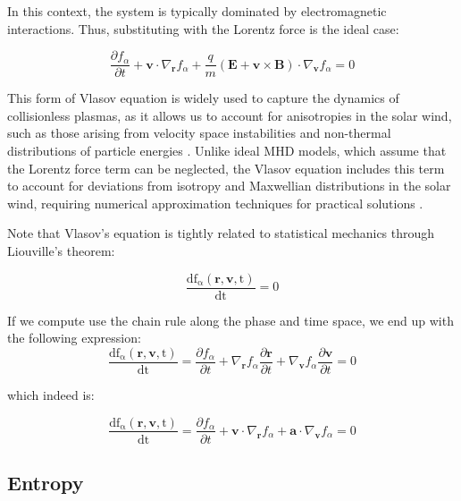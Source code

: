 \documentclass[12pt]{article}
\begin{document}
In this context, the system is typically dominated by electromagnetic interactions. Thus, substituting with the Lorentz force is the ideal case:

\begin{equation}
    \frac{\partial f_\alpha}{\partial t} + \mathbf{v} \cdot \nabla_{\mathbf{r}} f_\alpha + \frac{q}{m} (\mathbf{E} + \mathbf{v} \times \mathbf{B}) \cdot \nabla_{\mathbf{v}} f_\alpha = 0
\end{equation}

This form of Vlasov equation is widely used to capture the dynamics of collisionless plasmas, as it allows us to account for anisotropies in the solar wind, such as those arising from velocity space instabilities and non-thermal distributions of particle energies \cite{Verscharen_2016}. Unlike ideal MHD models, which assume that the Lorentz force term can be neglected, the Vlasov equation includes this term to account for deviations from isotropy and Maxwellian distributions in the solar wind, requiring numerical approximation techniques for practical solutions \cite{grandin2023hybridvlasovsimulationsoftxray}.

Note that Vlasov's equation is tightly related to statistical mechanics through Liouville's theorem:

\begin{equation}
    \frac{\mathrm{df_\alpha(\mathbf{r}, \mathbf{v}, t)}}{\mathrm{dt}} = 0
\end{equation}

If we compute use the chain rule along the phase and time space, we end up with the following expression:
\begin{equation}
    \frac{\mathrm{df_\alpha(\mathbf{r}, \mathbf{v}, t)}}{\mathrm{dt}} = \frac{\partial f_\alpha}{\partial t} + \nabla_{\mathbf{r}} f_\alpha \frac{\partial \mathbf{r}}{\partial t} + \nabla_{\mathbf{v}} f_\alpha \frac{\partial \mathbf{v}}{\partial t} = 0
\end{equation}

which indeed is:

\begin{equation}
    \frac{\mathrm{df_\alpha(\mathbf{r}, \mathbf{v}, t)}}{\mathrm{dt}} = \frac{\partial f_\alpha}{\partial t} + \mathbf{v} \cdot \nabla_{\mathbf{r}} f_\alpha + \mathbf{a} \cdot \nabla_{\mathbf{v}} f_\alpha = 0
\end{equation}


\subsection{Entropy}
\end{document}
